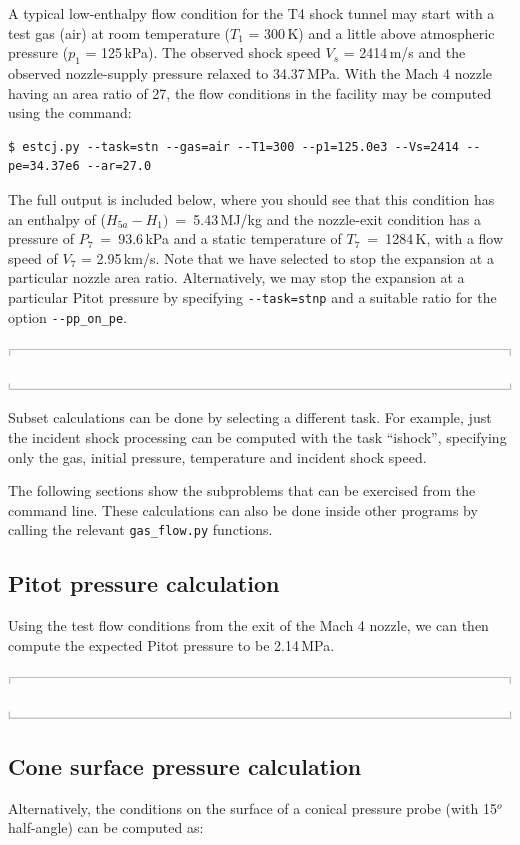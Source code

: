 \documentclass[10pt,a4paper]{article}
\newcommand{\topbar}{\ensuremath{
    \rule{0.1mm}{2.0mm} \rule[2.0mm]{159.5mm}{0.1mm} \rule{0.1mm}{2.0mm}
}}
\newcommand{\bottombar}{\ensuremath{
    \rule{0.1mm}{2.0mm} \rule{159.5mm}{0.1mm} \rule{0.1mm}{2.0mm}
}}
\begin{document}
\medskip
A typical low-enthalpy flow condition for the T4 shock tunnel may start with
a test gas (air) at room temperature ($T_1$ = 300\,K) 
and a little above atmospheric pressure ($p_1$ = 125\,kPa).
The observed shock speed $V_s$ = 2414\,m/s and the observed nozzle-supply pressure
relaxed to 34.37\,MPa.
With the Mach 4 nozzle having an area ratio of 27, the flow conditions in the facility
may be computed using the command:
\begin{verbatim}
$ estcj.py --task=stn --gas=air --T1=300 --p1=125.0e3 --Vs=2414 --pe=34.37e6 --ar=27.0
\end{verbatim}
The full output is included below, where you should see that
this condition has an enthalpy of ($H_{5a} - H_1)$~=~5.43\,MJ/kg and the nozzle-exit condition
has a pressure of $P_7$~=~93.6\,kPa and a static temperature of $T_7$~=~1284\,K,
with a flow speed of $V_7$ = 2.95\,km/s.
Note that we have selected to stop the expansion at a particular nozzle area ratio.
Alternatively, we may stop the expansion at a particular Pitot pressure by specifying
\verb?--task=stnp? and a suitable ratio for the option \verb?--pp_on_pe?.

\medskip
\noindent\topbar

\bottombar

\medskip
Subset calculations can be done by selecting a different task.
For example, just the incident shock processing can be computed with the task ``ishock'',
specifying only the gas, initial pressure, temperature and incident shock speed.

\medskip
The following sections show the subproblems that can be exercised from the command line.
These calculations can also be done inside other programs by calling 
the relevant \verb?gas_flow.py? functions.

\bigskip
\subsection{Pitot pressure calculation}
%
Using the test flow conditions from the exit of the Mach 4 nozzle, we can then
compute the expected Pitot pressure to be 2.14\,MPa.

\medskip
\noindent\topbar

\bottombar

\bigskip
\subsection{Cone surface pressure calculation}
%
Alternatively, the conditions on the surface of a conical pressure probe
(with 15$^o$ half-angle) can be computed as:
\end{document}
